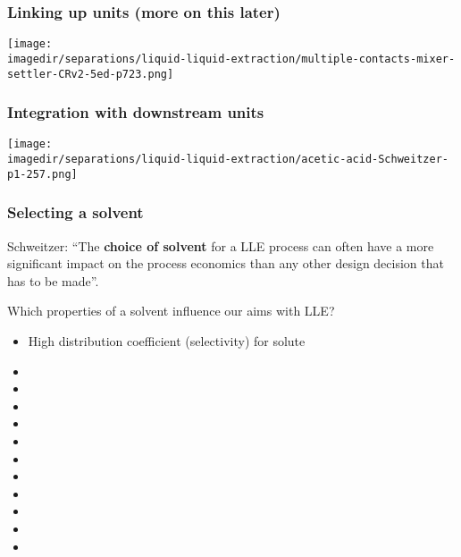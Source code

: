 \begin{frame}\frametitle{Linking up units (more on this later)}
	\begin{center}
		\texttt{[image: \\imagedir/separations/liquid-liquid-extraction/multiple-contacts-mixer-settler-CRv2-5ed-p723.png]}
	\end{center}
\end{frame}

\begin{frame}\frametitle{Integration with downstream units}
	\begin{center}
		\texttt{[image: \\imagedir/separations/liquid-liquid-extraction/acetic-acid-Schweitzer-p1-257.png]}
	\end{center}
	\vspace{-10pt}
\end{frame}

\begin{frame}\frametitle{Selecting a solvent}
	Schweitzer: ``The \textbf{choice of solvent} for a LLE process can often have a more significant impact on the process economics than any other design decision that has to be made''.
	
	\vspace{12pt}
	Which properties of a solvent influence our aims with LLE?
	\begin{itemize}
		\item	High distribution coefficient (selectivity) for solute 
		\pause
		\item	\iftoggle{instructor}{Low distribution coefficient for carrier}{}
		\item	\iftoggle{instructor}{Reasonable volatility difference with solute and carrier}{}
		\item	\iftoggle{instructor}{Reasonable surface tension: easy to disperse \textbf{and} coalesce}{}
		\item	\iftoggle{instructor}{High density difference: separates rapidly by gravity}{}
		\item	\iftoggle{instructor}{Stability to maximize its reuse}{}
		\item	\iftoggle{instructor}{Inert to materials of construction}{}
		\item	\iftoggle{instructor}{Low viscosity: maximizes mass transfer}{}
		\item	\iftoggle{instructor}{Safe: non-toxic, non-flammable}{}
		\item	\iftoggle{instructor}{Cheap, and easily available}{}
		\item	\iftoggle{instructor}{Compatible with carrier and solute: avoid contamination}{}
		\item	\iftoggle{instructor}{Doesn't foam, form emulsions, scum layers at interface}{}
	\end{itemize}
\end{frame}


